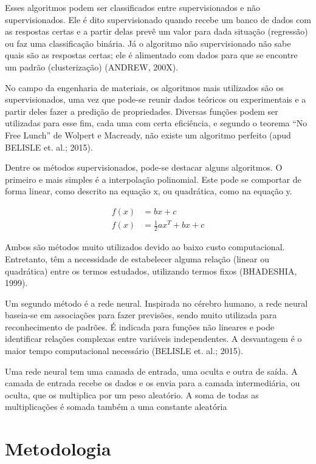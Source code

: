 \documentclass[hidelinks,brazil,dissertacao,epusp]{usp}
\begin{document}
Esses algoritmos podem ser classificados entre supervisionados e não supervisionados. Ele é dito supervisionado quando recebe um banco de dados com as respostas certas e a partir delas prevê um valor para dada situação (regressão) ou faz uma classificação binária. Já o algoritmo não supervisionado não sabe quais são as respostas certas; ele é alimentado com dados para que se encontre um padrão (clusterização) (ANDREW, 200X).

No campo da engenharia de materiais, os algoritmos mais utilizados são os supervisionados, uma vez que pode-se reunir dados teóricos ou experimentais e a partir deles fazer a predição de propriedades. Diversas funções podem ser utilizadas para esse fim, cada uma com certa eficiência, e segundo o teorema ``No Free Lunch'' de Wolpert e Macready, não existe um algoritmo perfeito (apud BELISLE et. al.; 2015).

Dentre os métodos supervisionados, pode-se destacar alguns algoritmos. O primeiro e mais simples é a interpolação polinomial. Este pode se comportar de forma linear, como descrito na equação x, ou quadrática, como na equação y. 

\begin{align}
  f(x) &= b x + c \\
  f(x) &= \frac{1}{2} a x^T + b x + c
\end{align}

Ambos são métodos muito utilizados devido ao baixo custo computacional. Entretanto, têm a necessidade de estabelecer alguma relação (linear ou quadrática) entre os termos estudados, utilizando termos fixos (BHADESHIA, 1999).

Um segundo método é a rede neural. Inspirada no cérebro humano, a rede neural baseia-se em associações para fazer previsões, sendo muito utilizada para reconhecimento de padrões. É indicada para funções não lineares e pode identificar relações complexas entre variáveis independentes. A desvantagem é o maior tempo computacional necessário (BELISLE et. al.; 2015).

Uma rede neural tem uma camada de entrada, uma oculta e outra de saída. A camada de entrada recebe os dados e os envia para a camada intermediária, ou oculta, que os multiplica por um peso aleatório. A soma de todas as multiplicações é somada também a uma constante aleatória

\chapter{Metodologia}
\end{document}
